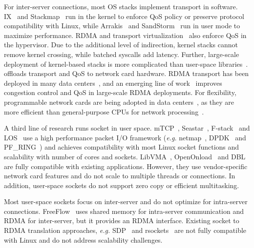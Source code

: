 For inter-server connections, most OS stacks implement transport in software. IX~\cite{belay2017ix} and Stackmap~\cite{yasukata2016stackmap} run in the kernel to enforce QoS policy or preserve protocol compatibility with Linux, while Arrakis~\cite{peter2016arrakis} and SandStorm~\cite{marinos2014network} run in user mode to maximize performance.
RDMA and transport virtualization~\cite{tsai2017lite,niu2017network} also enforce QoS in the hypervisor.
Due to the additional level of indirection, kernel stacks cannot remove kernel crossing, while batched syscalls add latency.
Further, large-scale deployment of kernel-based stacks is more complicated than user-space libraries~\cite{andromeda}.
\sys offloads transport and QoS to network card hardware.
RDMA transport has been deployed in many data centers~\cite{guo2016rdma}, and an emerging line of work~\cite{zhu2015congestion,lu2017memory,mprdma} improves congestion control and QoS in large-scale RDMA deployments.
For flexibility, programmable network cards are being adopted in data centers~\cite{smartnic,cavium}, as they are more efficient than general-purpose CPUs for network processing~\cite{kaufmann2015flexnic,li2016clicknp}.

A third line of research runs socket in user space.
mTCP~\cite{jeong2014mtcp}, Seastar~\cite{seastar}, 
F-stack~\cite{fstack} and LOS~\cite{huang2017high} use a high performance packet I/O framework (\textit{e.g.} netmap~\cite{rizzo2012netmap}, DPDK~\cite{dpdk} and PF\_RING~\cite{pf-ring}) and achieves compatibility with most Linux socket functions and scalability with number of cores and sockets.
LibVMA~\cite{libvma}, OpenOnload~\cite{openonload} and DBL~\cite{dbl} are fully compatible with existing applications. However, they use vendor-specific network card features and do not scale to multiple threads or connections.
In addition, user-space sockets do not support zero copy or efficient multitasking.

Most user-space sockets focus on inter-server and do not optimize for intra-server connections.
FreeFlow~\cite{freeflow} uses shared memory for intra-server communication and RDMA for inter-server, but it provides an RDMA interface.
Existing socket to RDMA translation approaches, \textit{e.g.} SDP~\cite{socketsdirect} and rsockets~\cite{rsockets} are not fully compatible with Linux and do not address scalability challenges.

